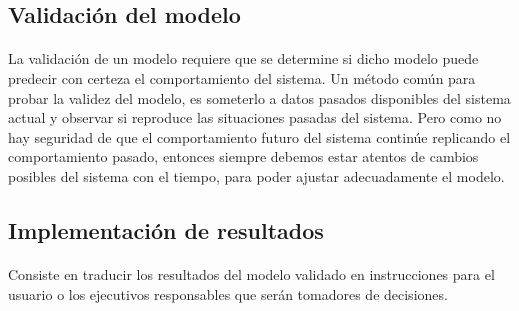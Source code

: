 \documentclass[12pt, a4paper,spanish]{article}
\begin{document}
		\subsection{Validación del modelo}

			\paragraph{}
			La validación de un modelo requiere que se determine si dicho modelo puede predecir con certeza el comportamiento del sistema. Un método común para probar la validez del modelo, es someterlo a datos pasados disponibles del sistema actual y observar si reproduce las situaciones pasadas del sistema. Pero como no hay seguridad de que el comportamiento futuro del sistema continúe replicando el comportamiento pasado, entonces siempre debemos estar atentos de cambios posibles del sistema con el tiempo, para poder ajustar adecuadamente el modelo.\cite{invdeop_IO}

		\subsection{Implementación de resultados}

			\paragraph{}
			Consiste en traducir los resultados del modelo validado en instrucciones para el usuario o los ejecutivos responsables que serán tomadores de decisiones.\cite{invdeop_IO}
\end{document}
